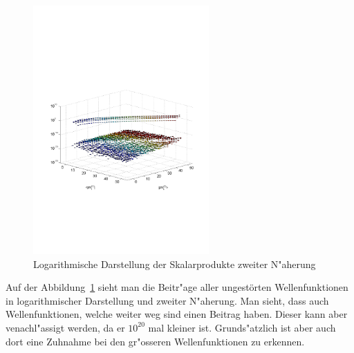 \begin{refsection}
\begin{figure}[h]	%
\centering
\includegraphics[width=0.6\textwidth]{anharmonisch/images/x3/PLK(2)log(abs)(2Stoerung).pdf}
\caption{Logarithmische Darstellung der Skalarprodukte zweiter N"aherung
\label{skript:x3_PLK(2)log(abs)(2Stoerung)}}
\end{figure}

Auf der Abbildung~\ref{skript:x3_PLK(2)log(abs)(2Stoerung)} sieht man die Beitr"age aller ungestörten Wellenfunktionen in logarithmischer Darstellung und zweiter N"aherung. Man sieht, dass auch Wellenfunktionen, welche weiter weg sind einen Beitrag haben. Dieser kann aber venachl"assigt werden, da er $10^20$ mal kleiner ist. Grunds"atzlich ist aber auch dort eine Zuhnahme bei den gr"osseren Wellenfunktionen zu erkennen.


\end{refsection}
